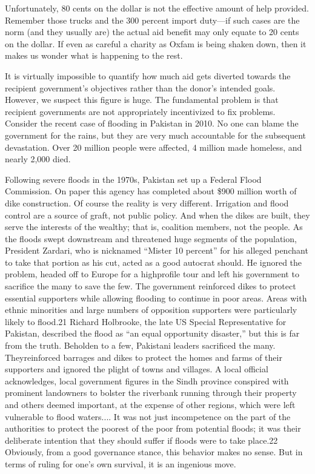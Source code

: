 \documentclass[10pt]{article}
\begin{document}
{\large Unfortunately, 80 cents on the dollar is not the effective amount of
help provided. Remember those trucks and the 300 percent import duty---if such
cases are the norm (and they usually are) the actual aid benefit may only equate
to 20 cents on the dollar. If even as careful a charity as Oxfam is being shaken
down, then it makes us wonder what is happening to the rest.}

{\large It is virtually impossible to quantify how much aid gets diverted
towards the recipient government's objectives rather than the donor's intended
goals. However, we suspect this figure is huge. The fundamental problem is that
recipient governments are not appropriately incentivized to fix problems.
Consider the recent case of flooding in Pakistan in 2010. No one can blame the
government for the rains, but they are very much accountable for the subsequent
devastation. Over 20 million people were affected, 4 million made homeless, and
nearly 2,000 died.}

{\large Following severe floods in the 1970s, Pakistan set up a Federal Flood
Commission. On paper this agency has completed about \$900 million worth of dike
construction. Of course the reality is very different. Irrigation and flood
control are a source of graft, not public policy. And when the dikes are built,
they serve the interests of the wealthy; that is, coalition members, not the
people. As the floods swept downstream and threatened huge segments of the
population, President Zardari, who is nicknamed ``Mister 10 percent'' for his
alleged penchant to take that portion as his cut, acted as a good autocrat
should. He ignored the problem, headed off to Europe for a highprofile tour and
left his government to sacrifice the many to save the few. The government
reinforced dikes to protect essential supporters while allowing flooding to
continue in poor areas. Areas with ethnic minorities and large numbers of
opposition supporters were particularly likely to flood.21 Richard Holbrooke, the
late US Special Representative for Pakistan, described the flood as ``an equal
opportunity disaster,'' but this is far from the truth. Beholden to a few,
Pakistani leaders sacrificed the many. Theyreinforced barrages and dikes to
protect the homes and farms of their supporters and ignored the plight of towns
and villages. A local official acknowledges, local government figures in the
Sindh province conspired with prominent landowners to bolster the riverbank
running through their property and others deemed important, at the expense of
other regions, which were left vulnerable to flood waters.... It was not just
incompetence on the part of the authorities to protect the poorest of the poor
from potential floods; it was their deliberate intention that they should suffer
if floods were to take place.22 Obviously, from a good governance stance, this
behavior makes no sense. But in terms of ruling for one's own survival, it is an
ingenious move.}
\end{document}
